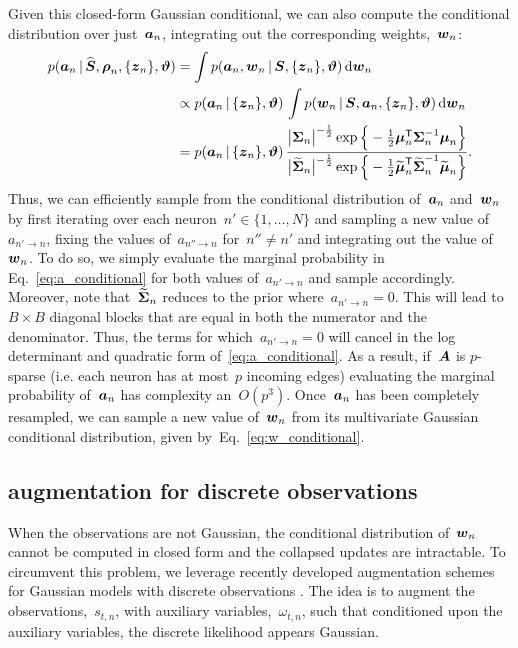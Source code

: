Given this closed-form Gaussian conditional, we can also compute
the conditional distribution over just~$\boldsymbol{a}_n$, integrating out
the corresponding weights,~$\boldsymbol{w}_n$:
\begin{align}
  \nonumber
  p(\boldsymbol{a}_n \,|\, \widehat{\boldsymbol{S}}, \boldsymbol{\rho}_n, \{\boldsymbol{z}_n\}, \boldsymbol{\vartheta})
  &= \int p(\boldsymbol{a}_n, \boldsymbol{w}_n \,|\, {\boldsymbol{S}}, \{\boldsymbol{z}_n\}, \boldsymbol{\vartheta}) \, \mathrm{d} \boldsymbol{w}_n \\
  \nonumber
  &\propto p(\boldsymbol{a}_n \,|\, \{\boldsymbol{z}_n\}, \boldsymbol{\vartheta}) \, \int p(\boldsymbol{w}_n \,|\, {\boldsymbol{S}}, \boldsymbol{a}_n, \{\boldsymbol{z}_n\}, \boldsymbol{\vartheta}) \, \mathrm{d} \boldsymbol{w}_n \\
  \label{eq:a_conditional}
  &= p(\boldsymbol{a}_n \,|\, \{\boldsymbol{z}_n\}, \boldsymbol{\vartheta}) \, \frac{\big| \boldsymbol{\Sigma}_n \big|^{-\frac{1}{2}} \exp \Big \{-\frac{1}{2} \boldsymbol{\mu}_n^{\mathsf{T}} \boldsymbol{\Sigma}_n^{-1} \boldsymbol{\mu}_n \Big \} }
  {\big| \widetilde{\boldsymbol{\Sigma}}_n \big|^{-\frac{1}{2}} \exp \Big \{-\frac{1}{2} \widetilde{\boldsymbol{\mu}}_n^{\mathsf{T}} \widetilde{\boldsymbol{\Sigma}}_n^{-1} \widetilde{\boldsymbol{\mu}}_n \Big \}}.
\end{align}
Thus, we can efficiently sample from the conditional
distribution of~$\boldsymbol{a}_n$ and~$\boldsymbol{w}_n$ by first iterating
over each neuron~${n' \in \{1, \ldots, N\}}$ and sampling
a new value of~$a_{n' \to n}$, fixing the values of~$a_{n'' \to n}$
for~$n'' \neq n'$ and integrating out the value of~$\boldsymbol{w}_n$.
To do so, we simply evaluate the marginal probability in Eq.~\ref{eq:a_conditional}
for both values of~$a_{n' \to n}$ and sample accordingly.
Moreover, note that~$\widetilde{\boldsymbol{\Sigma}}_n$ reduces to the prior
where~${a_{n' \to n}=0}$. This will lead to~${B \times B}$ diagonal blocks
that are equal in both the numerator and the denominator. Thus,
the terms for which~${a_{n' \to n}=0}$ will cancel in the log
determinant and quadratic form of~\ref{eq:a_conditional}.
As a result, if~$\boldsymbol{A}$ is $p$-sparse (i.e.  each neuron has
at most~$p$ incoming edges) evaluating the marginal probability
of~$\boldsymbol{a}_n$ has complexity an~$O(p^3)$.  Once~$\boldsymbol{a}_n$ has been
completely resampled, we can sample a new value of~$\boldsymbol{w}_n$ from its
multivariate Gaussian conditional distribution, given
by~Eq.~\ref{eq:w_conditional}.

\subsection{\polyagamma augmentation for discrete observations}
When the observations are not Gaussian, the conditional distribution
of~$\boldsymbol{w}_n$ cannot be computed in closed form and the collapsed
updates are intractable. To circumvent this problem, we leverage
recently developed augmentation schemes for Gaussian models with
discrete observations \citep{polson2013bayesian, Pillow2012}. The
idea is to augment the observations,~$s_{t,n}$, with auxiliary
variables,~$\omega_{t,n}$, such that conditioned upon the
auxiliary variables, the discrete likelihood appears Gaussian.

